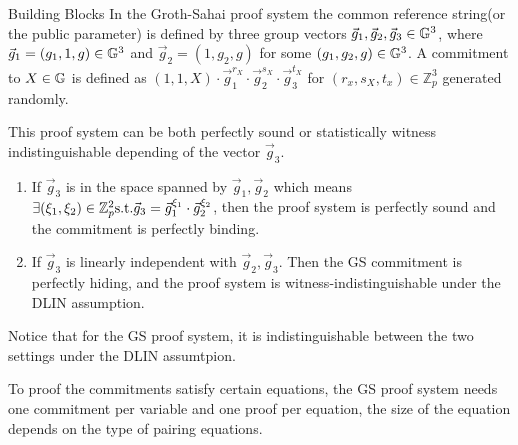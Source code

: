 \begin{subsection}{Building Blocks}
    In the Groth-Sahai proof system the common reference string(or the public parameter) is defined by three group vectors $\vec{g}_1, \vec{g}_2, \vec{g}_3 \in \mathbb{G}^3$, where $\vec{g}_1 = (g_1, 1, g) \in \mathbb{G}^3$ and $\vec{g}_2 = (1, g_2, g)$ for some $(g_1, g_2, g) \in \mathbb{G}^3$. A commitment to $X \in \mathbb{G}$ is defined as $(1, 1, X) \cdot \vec{g}_1^{r_X} \cdot \vec{g}_2^{s_X} \cdot \vec{g}_3^{t_X}$ for $(r_x, s_X, t_x) \in \mathbb{Z}_p^3$ generated randomly.

    This proof system can be both perfectly sound or statistically witness indistinguishable depending of the vector $\vec{g}_3$.
    \begin{enumerate}
    \item If $\vec{g}_3$ is in the space spanned by $\vec{g}_1, \vec{g}_2$ which means $\exists (\xi_1, \xi_2) \in \mathbb{Z}_p^2 \textrm{s.t.} \vec{g}_3 = \vec{g}_1^{\xi_1} \cdot \vec{g}_2^{\xi_2}$, then the proof system is perfectly sound and the commitment is perfectly binding.
    \item If $\vec{g}_3$ is linearly independent with $\vec{g}_2, \vec{g}_3$. Then the GS commitment is perfectly hiding, and the proof system is witness-indistinguishable under the DLIN assumption.
    \end{enumerate}

    Notice that for the GS proof system, it is indistinguishable between the two settings under the DLIN assumtpion. 

    To proof the commitments satisfy certain equations, the GS proof system needs one commitment per variable and one proof per equation, the size of the equation depends on the type of pairing equations.

\end{subsection}












